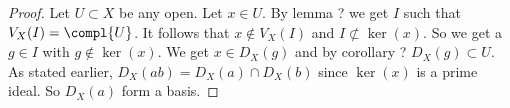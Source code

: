 \begin{proof}
Let $U\subset X$ be any open. Let $x\in U$.
By lemma ? we get $I$ such that $V_X(I) = \compl{U}$.
It follows that $x\not\in V_X(I)$ and $I\not\subset \ker(x)$.
So we get a $g\in I$ with $g\not\in \ker(x)$.
We get $x\in D_X(g)$ and by corollary ?%
$D_X(g) \subset U$.
As stated earlier, $D_X(ab) = D_X(a) \cap D_X(b)$ since $\ker(x)$ is a prime ideal.
So $D_X(a)$ form a basis.
\end{proof}
